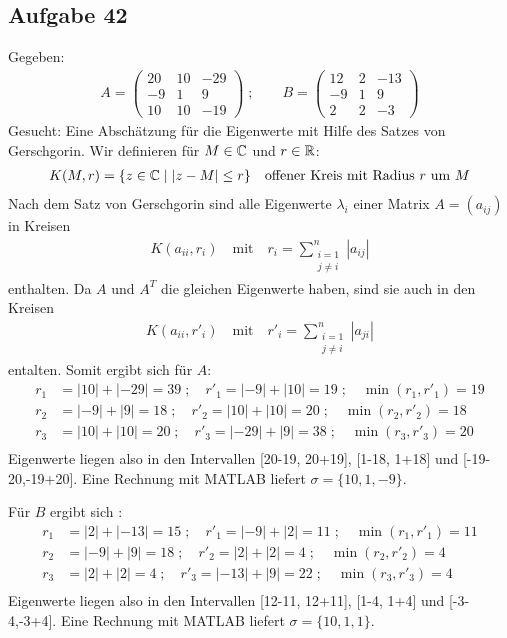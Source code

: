 \subsection*{Aufgabe 42}

Gegeben:
\begin{align*}
  A = \begin{pmatrix}20&10&-29\\ -9&1&9\\ 10&10&-19\end{pmatrix}\; ;  \qquad
  B = \begin{pmatrix}12&2&-13\\ -9&1&9\\ 2&2&-3\end{pmatrix}
\end{align*}
Gesucht: Eine Abschätzung für die Eigenwerte mit Hilfe des Satzes von Gerschgorin.
Wir definieren für $M \in \mathbb C$ und $r \in \mathbb R$:
\begin{align*}
  K(M,r) = \{z\in \mathbb C \mid | z - M | \le r\} \quad \text{offener Kreis mit Radius $r$ um $M$}
\end{align*}
Nach dem Satz von Gerschgorin sind alle Eigenwerte $\lambda_i$ einer Matrix $A = (a_{ij})$
in Kreisen
\begin{align*}
  K(a_{ii}, r_i) \quad \text{mit} \quad r_i = \sum_{\substack{i = 1\\j \ne i}}^n |a_{ij} |
\end{align*}
enthalten. Da $A$ und $A^T$ die gleichen Eigenwerte haben, sind sie auch in den Kreisen
\begin{align*}
  K(a_{ii}, r'_i) \quad \text{mit} \quad r'_i = \sum_{\substack{i = 1\\j \ne i}}^n |a_{ji} |
\end{align*}
entalten. Somit ergibt sich für $A$:
\begin{align*}
  r_1 &= |10| + |-29| = 39\;; \quad r'_1 = |-9| + |10| = 19\;; \quad\min(r_1, r'_1) = 19\\
  r_2 &= |-9| + |9| = 18\;; \quad r'_2 = |10| + |10| = 20\;; \quad \min(r_2, r'_2) = 18\\
  r_3 &= |10| + |10| = 20\;; \quad r'_3 = |-29| + |9| = 38\;; \quad \min(r_3, r'_3) = 20\\
\end{align*}
Eigenwerte liegen also in den Intervallen [20-19, 20+19], [1-18, 1+18] und [-19-20,-19+20].
Eine Rechnung mit MATLAB liefert $\sigma = \{10, 1, -9\}$.

Für $B$ ergibt sich :
\begin{align*}
  r_1 &= |2| + |-13| = 15\;; \quad r'_1 = |-9| + |2| = 11\;; \quad\min(r_1, r'_1) = 11\\
  r_2 &= |-9| + |9| = 18\;; \quad r'_2 = |2| + |2| = 4\;; \quad \min(r_2, r'_2) = 4\\
  r_3 &= |2| + |2| = 4\;; \quad r'_3 = |-13| + |9| = 22\;; \quad \min(r_3, r'_3) = 4\\
\end{align*}
Eigenwerte liegen also in den Intervallen [12-11, 12+11], [1-4, 1+4] und [-3-4,-3+4].
Eine Rechnung mit MATLAB liefert $\sigma = \{10, 1, 1\}$.
